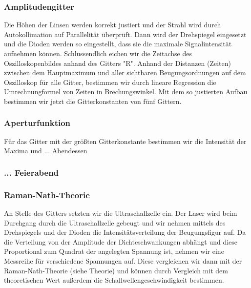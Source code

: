 \subsubsection{Amplitudengitter}

Die H\"ohen der Linsen werden korrekt justiert und der Strahl wird durch Autokollimation auf Parallelit\"at \"uberpr\"uft. Dann wird der Drehspiegel eingesetzt und die Dioden werden so eingestellt, dass sie die maximale Signalintensit\"at aufnehmen k\"onnen. Schlussendlich eichen wir die Zeitachse des Oszilloskopenbildes anhand des Gitters "R". Anhand der Distanzen (Zeiten) zwischen dem Hauptmaximum und aller sichtbaren Beugungsordnungen auf dem Oszilloskop f\"ur alle Gitter, bestimmen wir durch lineare Regression die Umrechnungformel von Zeiten in Brechungswinkel.
Mit dem so justierten Aufbau bestimmen wir jetzt die Gitterkonstanten von fünf Gittern.

\subsubsection{Aperturfunktion}
Für das Gitter mit der größten Gitterkonstante bestimmen wir die Intensität der Maxima und ... Abendessen

\subsubsection{... Feierabend }
\subsubsection{Raman-Nath-Theorie}

An Stelle des Gitters setzten wir die Ultraschallzelle ein. Der Laser wird beim Durchgang durch die Ultraschallzelle gebeugt und wir nehmen mittels des Drehspiegels und der Dioden die Intensitätsverteilung der Beugungsfigur auf. Da die Verteilung von der Amplitude der Dichteschwankungen abhängt und diese Proportional zum Quadrat der angelegten Spannung ist, nehmen wir eine Messreihe für verschiedene Spannungen auf. Diese vergleichen wir dann mit der Raman-Nath-Theorie (siehe Theorie) und können durch Vergleich mit dem theoretischen Wert außerdem die Schallwellengeschwindigkeit bestimmen.

\clearpage